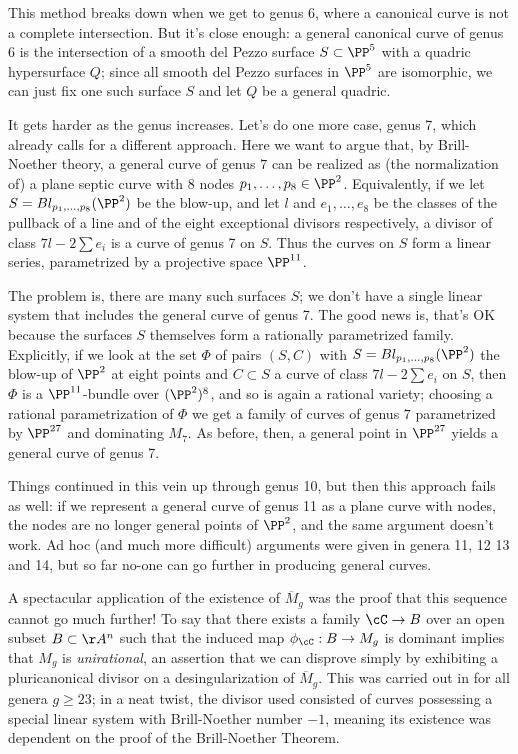 This method breaks down when we get to genus 6, where a canonical curve is not a complete intersection. But it's close enough: a general canonical curve of genus 6 is the intersection of a smooth del Pezzo surface $S \subset \PP^5$ with a quadric hypersurface $Q$; since all smooth del Pezzo surfaces in $\PP^5$ are isomorphic, we can just fix one such surface $S$ and let $Q$ be a general quadric.

It gets harder as the genus increases. Let's do one more case, genus 7, which already calls for a different approach. Here we want to argue that, by Brill-Noether theory, a general curve of genus $7$ can be realized as (the normalization of) a plane septic curve with 8 nodes $p_1,\dots,p_8 \in \PP^2$. Equivalently, if we let $S = Bl_{p_1,\dots,p_8}(\PP^2)$ be the blow-up, and let $l$ and $e_1,\dots,e_8$ be the classes of the pullback of a line and of the eight exceptional divisors respectively, a divisor of class $7l - 2 \sum e_i$ is a curve of genus 7 on $S$. Thus the curves on $S$ form a linear series, parametrized by a projective space $\PP^{11}$.

The problem is, there are many such surfaces $S$; we don't have a single linear system that includes the general curve of genus 7. The good news is, that's OK because the surfaces $S$ themselves form a rationally parametrized family. Explicitly, if we look at the set $\Phi$ of pairs $(S, C)$ with $S = Bl_{p_1,\dots,p_8}(\PP^2)$  the blow-up of $\PP^2$ at eight points and $C \subset S$ a curve of class $7l - 2 \sum e_i$ on $S$, then $\Phi$ is a $\PP^{11}$-bundle over $(\PP^2)^8$, and so is again a rational variety; choosing a rational parametrization of $\Phi$ we get a family of curves of genus $7$ parametrized by $\PP^{27}$ and dominating $M_7$. As before, then, a general point in $\PP^{27}$ yields a general curve of genus 7.

Things continued in this vein up through genus 10, but then this approach fails as well: if we represent a general curve of genus 11 as a plane curve with nodes, the nodes are no longer general points of $\PP^2$, and the same argument doesn't work. Ad hoc (and much more difficult) arguments were given in genera 11, 12 13 and 14, but so far no-one can go further in producing general curves. 

A spectacular application of the existence of $\overline M_g$ was the proof that this sequence cannot go much further! To say that there exists a family $\cC \to B$ over an open subset $B \subset \AA^n$ such that the induced map $\phi_\cC : B \to M_g$ is dominant implies that $M_g$ is \emph{unirational}, an assertion that we can disprove simply by exhibiting a pluricanonical divisor on a desingularization of $\overline M_g$. This was carried out in  for all genera $g \geq 23$; in a neat twist, the divisor used consisted of curves possessing a special linear system with Brill-Noether number $-1$, meaning its existence was dependent on the proof of the Brill-Noether Theorem.

